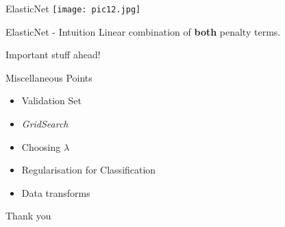 \documentclass{beamer}
\begin{document}
\begin{frame}{ElasticNet}
    \texttt{[image: pic12.jpg]}
\end{frame}

\begin{frame}{ElasticNet - Intuition}
    Linear combination of \textbf{both} penalty terms.
\end{frame}

\begin{frame}{}
    Important stuff ahead!
\end{frame}

\begin{frame}{Miscellaneous Points}
\begin{itemize}
    \item Validation Set
    \item \textit{GridSearch}
    \item Choosing $\lambda$
    \item Regularisation for Classification
    \item Data transforms
\end{itemize}
    
\end{frame}


\begin{frame}
    Thank you
\end{frame}
\end{document}
